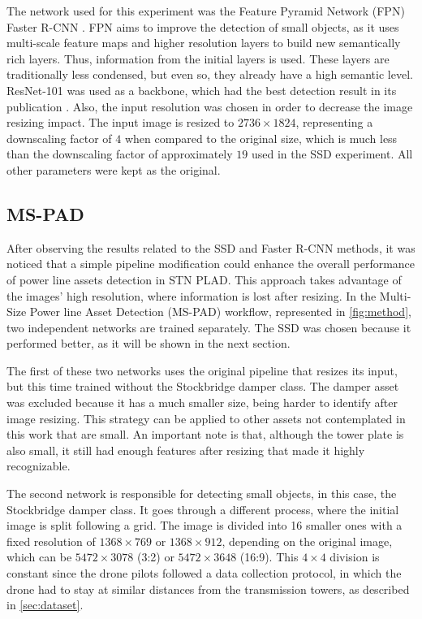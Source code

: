\documentclass[10pt,conference]{IEEEtran}
\begin{document}
The network used for this experiment was the Feature Pyramid Network (FPN) Faster R-CNN \cite{lin2017feature}. FPN aims to improve the detection of small objects, as it uses multi-scale feature maps and higher resolution layers to build new semantically rich layers. Thus, information from the initial layers is used. These layers are traditionally less condensed, but even so, they already have a high semantic level. ResNet-101 was used as a backbone, which had the best detection result in its publication \cite{lin2017feature}. Also, the input resolution was chosen in order to decrease the image resizing impact. The input image is resized to $2736\times1824$, representing a downscaling factor of $4$ when compared to the original size, which is much less than the downscaling factor of approximately $19$ used in the SSD experiment. All other parameters were kept as the original. 







\subsection{MS-PAD}
\label{sec:ourmethod}

After observing the results related to the SSD and Faster R-CNN methods, it was noticed that a simple pipeline modification could enhance the overall performance of power line assets detection in STN PLAD. This approach takes advantage of the images' high resolution, where information is lost after resizing. In the Multi-Size Power line Asset Detection (MS-PAD) workflow, represented in \autoref{fig:method}, two independent networks are trained separately. The SSD was chosen because it performed better, as it will be shown in the next section.

The first of these two networks uses the original pipeline that resizes its input, but this time trained without the Stockbridge damper class. The damper asset was excluded because it has a much smaller size, being harder to identify after image resizing. This strategy can be applied to other assets not contemplated in this work that are small. An important note is that, although the tower plate is also small, it still had enough features after resizing that made it highly recognizable.

The second network is responsible for detecting small objects, in this case, the Stockbridge damper class. It goes through a different process, where the initial image is split following a grid. The image is divided into 16 smaller ones with a fixed resolution of $1368\times769$ or $1368\times912$, depending on the original image, which can be $5472\times3078$ (3:2) or $5472\times3648$ (16:9). This $4\times4$ division is constant since the drone pilots followed a data collection protocol, in which the drone had to stay at similar distances from the transmission towers, as described in \autoref{sec:dataset}. 
\end{document}
